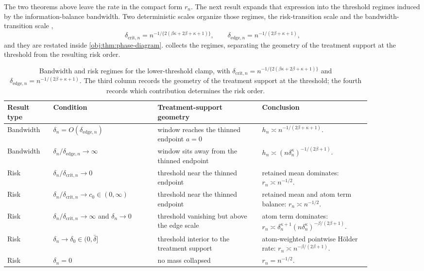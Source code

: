 \documentclass[11pt]{article}
\begin{document}
The two theorems above leave the rate in the compact form \(r_n\). The next result expands that expression into the threshold regimes induced by the information-balance bandwidth. Two deterministic scales organize those regimes, the risk-transition scale  and the bandwidth-transition scale ,
\[
\delta_{\mathrm{crit},n}
=
n^{-1/\{2(\beta\kappa+2\beta+\kappa+1)\}},
\qquad
\delta_{\mathrm{edge},n}
=
n^{-1/(2\beta+\kappa+1)} ,
\]
and they are restated inside \cref{obj:thm:phase-diagram}.  collects the regimes, separating the geometry of the treatment support at the threshold from the resulting risk order.

\begin{table}[t]
\centering
\begin{tabular}{p{0.11\linewidth}p{0.25\linewidth}p{0.25\linewidth}p{0.26\linewidth}}
\hline
Result type & Condition & Treatment-support geometry & Conclusion \\
\hline
Bandwidth & \(\delta_n=O(\delta_{\mathrm{edge},n})\) & window reaches the thinned endpoint \(a=0\) & \(h_n\asymp n^{-1/(2\beta+\kappa+1)}\). \\
Bandwidth & \(\delta_n/\delta_{\mathrm{edge},n}\to\infty\) & window sits away from the thinned endpoint & \(h_n\asymp (n\delta_n^\kappa)^{-1/(2\beta+1)}\). \\
Risk & \(\delta_n/\delta_{\mathrm{crit},n}\to0\) & threshold near the thinned endpoint & retained mean dominates: \(r_n\asymp n^{-1/2}\). \\
Risk & \(\delta_n/\delta_{\mathrm{crit},n}\to c_0\in(0,\infty)\) & threshold near the thinned endpoint & retained mean and atom term balance: \(r_n\asymp n^{-1/2}\). \\
Risk & \(\delta_n/\delta_{\mathrm{crit},n}\to\infty\) and \(\delta_n\to0\) & threshold vanishing but above the edge scale & atom term dominates: \(r_n\asymp \delta_n^{\kappa+1}(n\delta_n^\kappa)^{-\beta/(2\beta+1)}\). \\
Risk & \(\delta_n\to\delta_0\in(0,\bar\delta]\) & threshold interior to the treatment support & atom-weighted pointwise Hölder rate: \(r_n\asymp n^{-\beta/(2\beta+1)}\). \\
Risk & \(\delta_n=0\) & no mass collapsed & \(r_n=n^{-1/2}\). \\
\hline
\end{tabular}
\caption{Bandwidth and risk regimes for the lower-threshold clamp, with \(\delta_{\mathrm{crit},n}=n^{-1/\{2(\beta\kappa+2\beta+\kappa+1)\}}\) and \(\delta_{\mathrm{edge},n}=n^{-1/(2\beta+\kappa+1)}\). The third column records the geometry of the treatment support at the threshold; the fourth records which contribution determines the risk order.}
\label{tab:phase-summary}
\end{table}
\end{document}
